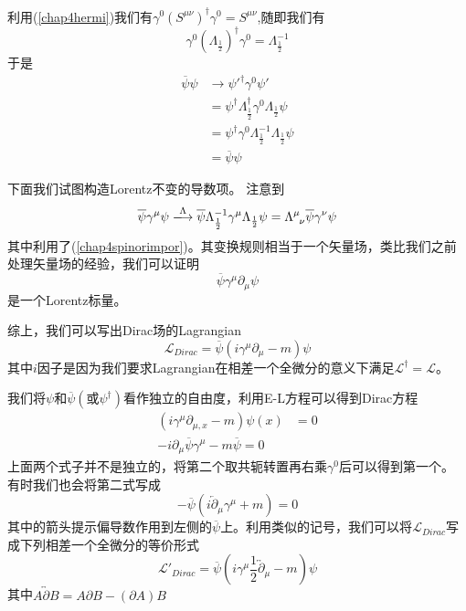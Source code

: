 利用(\ref{chap4hermi})我们有$\gamma^{0}(S^{\mu\nu})^{\dagger}\gamma^{0}=S^{\mu\nu}$,随即我们有
\begin{equation}
    \gamma^{0}(\Lambda_{\frac{1}{2}})^{\dagger}\gamma^{0}=\Lambda_{\frac{1}{2}}^{-1}
\end{equation}
于是
\begin{equation}
    \begin{aligned}
        \overline{\psi}\psi&\rightarrow \psi'^{\dagger}\gamma^{0}\psi'\\
        &=\psi^{\dagger}\Lambda_{\frac{1}{2}}^{\dagger}\gamma^{0}\Lambda_{\frac{1}{2}}\psi\\
        &=\psi^{\dagger}\gamma^{0}\Lambda_{\frac{1}{2}}^{-1}\Lambda_{\frac{1}{2}}\psi\\
        &=\overline{\psi}\psi
    \end{aligned}
\end{equation}

下面我们试图构造Lorentz不变的导数项。
注意到
\begin{equation}
    \overline{\psi}\gamma^{\mu}\psi\xlongrightarrow{\Lambda}\overline{\psi}\Lambda_{\frac{1}{2}}^{-1}\gamma^{\mu}\Lambda_{\frac{1}{2}}\psi=\Lambda^{\mu}_{\;\;\nu}\overline{\psi}\gamma^{\nu}\psi
\end{equation}
其中利用了(\ref{chap4spinorimpor})。其变换规则相当于一个矢量场，类比我们之前处理矢量场的经验，我们可以证明
\begin{equation}
    \overline{\psi}\gamma^{\mu}\partial_{\mu}\psi
\end{equation}
是一个Lorentz标量。

综上，我们可以写出Dirac场的Lagrangian
\begin{equation}
    \mathcal{L}_{Dirac}=\overline{\psi}\left(i\gamma^{\mu}\partial_{\mu}-m \right)\psi
\end{equation}
其中$i$因子是因为我们要求Lagrangian在相差一个全微分的意义下满足$\mathcal{L}^{\dagger}=\mathcal{L}$。

我们将$\psi$和$\overline{\psi}(\text{或}\psi^{\dagger})$看作独立的自由度，利用E-L方程可以得到Dirac方程
\begin{equation}
\label{chap4Diracdouble}
    \begin{aligned}
        (i\gamma^{\mu}\partial_{\mu,x}-m)\psi(x)&=0\\
        -i\partial_{\mu}\overline{\psi}\gamma^{\mu}-m\overline{\psi}=0
    \end{aligned}
\end{equation}
上面两个式子并不是独立的，将第二个取共轭转置再右乘$\gamma^{0}$后可以得到第一个。
有时我们也会将第二式写成
\begin{equation}
    -\overline{\psi}(i\overleftarrow{\partial}_{\mu}\gamma^{\mu}+m)=0
\end{equation}
其中的箭头提示偏导数作用到左侧的$\overline{\psi}$上。利用类似的记号，我们可以将$\mathcal{L}_{Dirac}$写成下列相差一个全微分的等价形式
\begin{equation}
    \mathcal{L'}_{Dirac}=\overline{\psi}\left(i\gamma^{\mu}\frac{1}{2}\overleftrightarrow{\partial}_{\mu}-m \right)\psi
\end{equation}
其中$A\overleftrightarrow{\partial}B=A\partial B-\left(\partial A\right) B$

